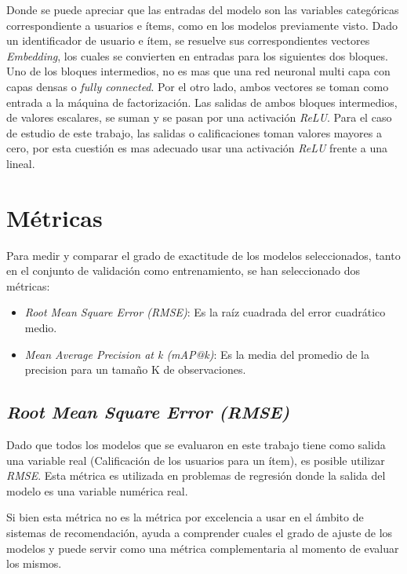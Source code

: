 \documentclass[11pt,a4paper,twoside]{thesis}
\begin{document}
Donde se puede apreciar que las entradas del modelo son las variables
categóricas correspondiente a usuarios e ítems, como en los modelos previamente
visto. Dado un identificador de usuario e ítem, se resuelve sus
correspondientes vectores \textit{Embedding}, los cuales se convierten en
entradas para los siguientes dos bloques. Uno de los bloques intermedios, no es
mas que una red neuronal multi capa con capas densas o \textit{fully
	connected}. Por el otro lado, ambos vectores se toman como entrada a la máquina
de factorización. Las salidas de ambos bloques intermedios, de valores
escalares, se suman y se pasan por una activación \textit{ReLU}. Para el caso
de estudio de este trabajo, las salidas o calificaciones toman valores mayores
a cero, por esta cuestión es mas adecuado usar una activación \textit{ReLU}
frente a una lineal.

\section{Métricas}

Para medir y comparar el grado de exactitude de los modelos seleccionados,
tanto en el conjunto de validación como entrenamiento, se han seleccionado dos
métricas:

\begin{itemize}
	\item \textit{Root Mean Square Error (RMSE)}: Es la raíz cuadrada del error
	      cuadrático medio.
	\item \textit{Mean Average Precision at k (mAP@k)}: Es la media del
	      promedio de la precision  para un tamaño K de observaciones.
\end{itemize}

\subsection{\textit{Root Mean Square Error (RMSE)}}

Dado que todos los modelos que se evaluaron en este trabajo tiene como salida
una variable real (Calificación de los usuarios para un ítem), es posible
utilizar \textit{RMSE}. Esta métrica es utilizada en problemas de regresión
donde la salida del modelo es una variable numérica real.

Si bien esta métrica no es la métrica por excelencia a usar en el ámbito de
sistemas de recomendación, ayuda a comprender cuales el grado de ajuste de los
modelos y puede servir como una métrica complementaria al momento de evaluar
los mismos.
\end{document}
